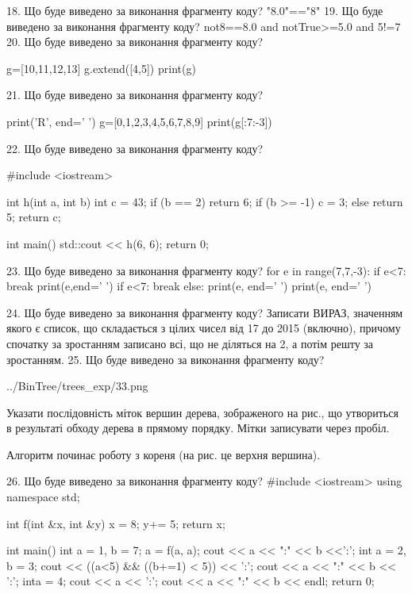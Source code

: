 \documentclass[11pt]{article}
\begin{document}
18. Що буде виведено за виконання фрагменту коду?
"8.0"=="8"
19. Що буде виведено за виконання фрагменту коду?
not8==8.0 and notTrue>=5.0 and 5!=7
20. Що буде виведено за виконання фрагменту коду?

g=[10,11,12,13]
g.extend([4,5])
print(g)


21. Що буде виведено за виконання фрагменту коду?

print('R', end=' ')
g=[0,1,2,3,4,5,6,7,8,9]
print(g[:7:-3])


22. Що буде виведено за виконання фрагменту коду?

#include <iostream>

int h(int a, int b){
    int c = 43;
    if (b == 2)
        return 6;
    if (b >= -1)
         c = 3;
    else 
        return 5;
    return c;
}

int main(){
    std::cout << h(6, 6);
    return 0;
}

23. Що буде виведено за виконання фрагменту коду?
for e in range(7,7,-3):
    if e<7:
        break
        print(e,end=' ')
    if e<7:
        break
else:
    print(e, end=' ')
print(e, end=' ')

24. Що буде виведено за виконання фрагменту коду?
Записати ВИРАЗ, значенням якого є список, що складається з цілих чисел від 17 до 2015 (включно), причому спочатку за зростанням записано всі, що не діляться на 2, а потім решту за зростанням.
25. Що буде виведено за виконання фрагменту коду?

\begin{center}
	{../BinTree/trees_exp/33.png}
\end{center}
Указати послідовність міток вершин дерева, зображеного на рис., що утвориться в результаті обходу дерева в прямому порядку. Мітки записувати через пробіл.\par Алгоритм починає роботу з кореня (на рис. це верхня вершина).

26. Що буде виведено за виконання фрагменту коду?
#include <iostream>
using namespace std;

int f(int &x, int &y){
    x = 8;
    y+= 5;
    return x;
}

int main(){
    int a = 1, b = 7;
    a = f(a, a);
    cout << a << ":" << b <<':';
    {
        int a = 2, b = 3;
        cout << ((a<5) && ((b+=1) < 5)) << ':';
        cout << a << ":" << b << ':';
    }
    {
        inta = 4;
        cout << a << ':';
    }
    cout << a << ":" << b << endl;
    return 0;
}
\end{document}
